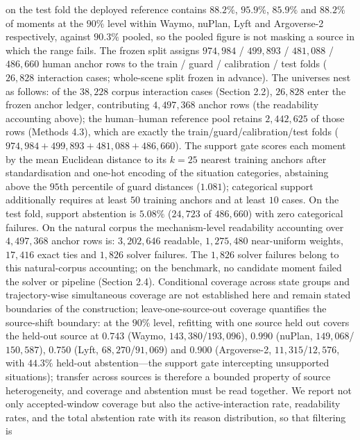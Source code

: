 \documentclass[12pt,a4paper]{article}
\begin{document}
on the test fold the deployed reference contains $88.2\%$, $95.9\%$, $85.9\%$ and $88.2\%$ of
moments at the $90\%$ level within Waymo, nuPlan, Lyft and Argoverse-2 respectively, against $90.3\%$
pooled, so the pooled figure is not masking a source in which the range fails.
The frozen split assigns $974{,}984$ / $499{,}893$ / $481{,}088$ / $486{,}660$ human anchor rows to
the train / guard / calibration / test folds ($26{,}828$ interaction cases; whole-scene split frozen
in advance). The universes nest as follows: of the $38{,}228$ corpus interaction cases (Section 2.2),
$26{,}828$ enter the frozen anchor ledger, contributing $4{,}497{,}368$ anchor rows (the readability
accounting above); the human--human reference pool retains $2{,}442{,}625$ of those rows (Methods
4.3), which are exactly the train/guard/calibration/test folds
($974{,}984+499{,}893+481{,}088+486{,}660$). The support gate scores each moment by the mean Euclidean distance to its $k=25$
nearest training anchors after standardisation and one-hot encoding of the situation categories,
abstaining above the $95$th percentile of guard distances ($1.081$); categorical support
additionally requires at least $50$ training anchors and at least $10$ cases. On the test fold,
support abstention is $5.08\%$ ($24{,}723$ of $486{,}660$) with zero categorical failures. On the
natural corpus the mechanism-level readability accounting over $4{,}497{,}368$ anchor rows is:
$3{,}202{,}646$ readable, $1{,}275{,}480$ near-uniform weights, $17{,}416$ exact ties and $1{,}826$
solver failures. The $1{,}826$ solver failures belong to this natural-corpus accounting; on the benchmark, no
candidate moment failed the solver or pipeline (Section 2.4). Conditional coverage across state groups and trajectory-wise simultaneous coverage
are not established here and remain stated boundaries of the construction; leave-one-source-out
coverage quantifies the source-shift boundary: at the $90\%$ level, refitting with one source held out
covers the held-out source at
$0.743$ (Waymo, $143{,}380$/$193{,}096$), $0.990$ (nuPlan, $149{,}068$/$150{,}587$), $0.750$ (Lyft,
$68{,}270$/$91{,}069$) and $0.900$ (Argoverse-2, $11{,}315$/$12{,}576$, with $44.3\%$ held-out
abstention---the support gate intercepting unsupported situations); transfer across sources is
therefore a bounded property of source heterogeneity, and coverage and abstention must be read
together. We report not only accepted-window coverage but also the active-interaction rate,
readability rates, and the total abstention rate with its reason distribution, so that filtering is
\end{document}

